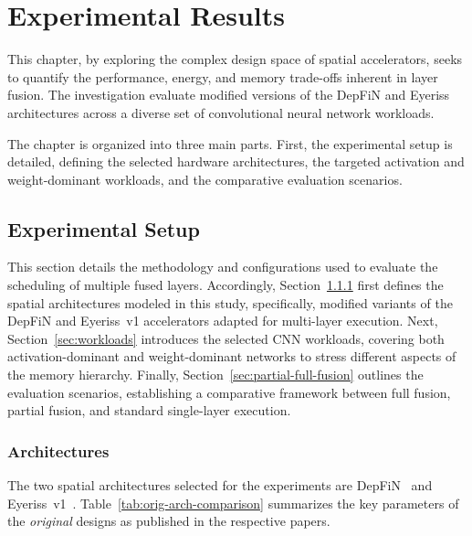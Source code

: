 \chapter{Experimental Results}
\label{ch:experimental-results}
This chapter, by exploring the complex design space of spatial accelerators, seeks to quantify the performance, energy, and memory trade-offs inherent in layer fusion. The investigation evaluate modified versions of the DepFiN and Eyeriss architectures across a diverse set of convolutional neural network workloads.

The chapter is organized into three main parts. First, the experimental setup is detailed, defining the selected hardware architectures, the targeted activation and weight-dominant workloads, and the comparative evaluation scenarios. 

\section{Experimental Setup}

This section details the methodology and configurations used to evaluate the scheduling of multiple fused layers. Accordingly, Section~\ref{sec:architectures} first defines the spatial architectures modeled in this study, specifically, modified variants of the DepFiN and Eyeriss~v1 accelerators adapted for multi-layer execution. Next, Section~\ref{sec:workloads} introduces the selected CNN workloads, covering both activation-dominant and weight-dominant networks to stress different aspects of the memory hierarchy. Finally, Section~\ref{sec:partial-full-fusion} outlines the evaluation scenarios, establishing a comparative framework between full fusion, partial fusion, and standard single-layer execution.

\subsection{Architectures}
\label{sec:architectures}

The two spatial architectures selected for the experiments are
DepFiN~\cite{goetschalckx2023depfin} and Eyeriss~v1~\cite{eyeriss}.
Table~\ref{tab:orig-arch-comparison} summarizes the key parameters of the
\emph{original} designs as published in the respective papers.


